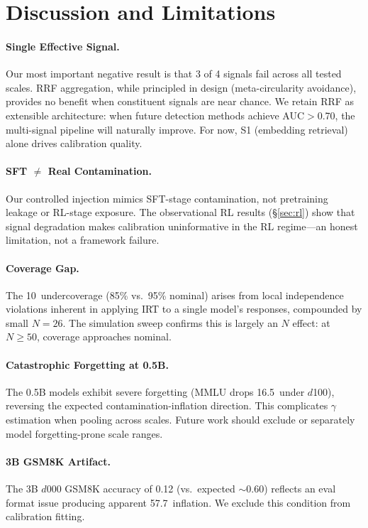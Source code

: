 \documentclass[11pt,a4paper]{article}
\newcommand{\pp}{\,\text{pp}}
\begin{document}
\section{Discussion and Limitations}
\label{sec:discussion}

\paragraph{Single Effective Signal.}
Our most important negative result is that 3 of 4 signals fail across all tested scales.
RRF aggregation, while principled in design (meta-circularity avoidance), provides no benefit when constituent signals are near chance.
We retain RRF as extensible architecture: when future detection methods achieve AUC$>$0.70, the multi-signal pipeline will naturally improve.
For now, S1 (embedding retrieval) alone drives calibration quality.

\paragraph{SFT $\neq$ Real Contamination.}
Our controlled injection mimics SFT-stage contamination, not pretraining leakage or RL-stage exposure.
The observational RL results (\S\ref{sec:rl}) show that signal degradation makes calibration uninformative in the RL regime---an honest limitation, not a framework failure.

\paragraph{Coverage Gap.}
The 10\pp{} undercoverage (85\% vs.\ 95\% nominal) arises from local independence violations inherent in applying IRT to a single model's responses, compounded by small $N=26$.
The simulation sweep confirms this is largely an $N$ effect: at $N\geq50$, coverage approaches nominal.

\paragraph{Catastrophic Forgetting at 0.5B.}
The 0.5B models exhibit severe forgetting (MMLU drops 16.5\pp{} under $d$100), reversing the expected contamination-inflation direction.
This complicates $\gamma$ estimation when pooling across scales.
Future work should exclude or separately model forgetting-prone scale ranges.

\paragraph{3B GSM8K Artifact.}
The 3B $d$000 GSM8K accuracy of 0.12 (vs.\ expected $\sim$0.60) reflects an eval format issue producing apparent 57.7\pp{} inflation.
We exclude this condition from calibration fitting.
\end{document}
